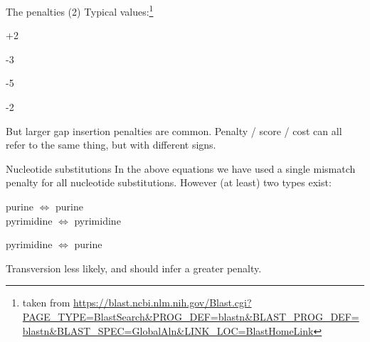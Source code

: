 \documentclass[pdf]{beamer}
\begin{document}
\begin{frame}{The penalties (2)}
  Typical values:\footnote{taken from \url{https://blast.ncbi.nlm.nih.gov/Blast.cgi?PAGE_TYPE=BlastSearch&PROG_DEF=blastn&BLAST_PROG_DEF=blastn&BLAST_SPEC=GlobalAln&LINK_LOC=BlastHomeLink}}
  \begin{description}
  \item[Match] +2
  \item[Mismatch] -3
  \item[Gap Insertion] -5
  \item[Gap Extension] -2
  \end{description}

  But larger gap insertion penalties are common.
  \vspace{0.2cm}
  Penalty / score / cost can all refer to the same thing, but with different signs.
  
\end{frame}

\begin{frame}{Nucleotide substitutions}
  In the above equations we have used a single mismatch penalty for all
  nucleotide substitutions. However (at least) two types exist:
 
 \vspace{0.2cm}
  \begin{description}[Transversion]
  \item[Transition] purine $\Leftrightarrow$ purine \\ pyrimidine
    $\Leftrightarrow$ pyrimidine
  \item[Transversion] pyrimidine $\Leftrightarrow$ purine
  \end{description}
    
  Transversion less likely, and should infer a greater penalty.

\end{frame}
\end{document}

